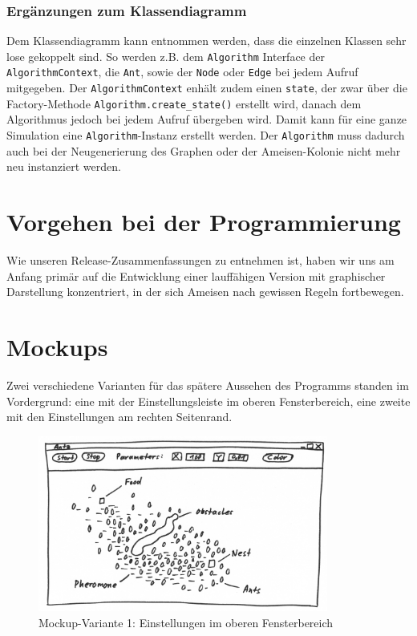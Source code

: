 \pagebreak
\subsubsection*{Ergänzungen zum Klassendiagramm}

Dem Klassendiagramm kann entnommen werden, dass die einzelnen Klassen sehr lose gekoppelt sind. So werden z.B. dem \texttt{Algorithm} Interface der \texttt{AlgorithmContext}, die \texttt{Ant}, sowie der \texttt{Node} oder \texttt{Edge} bei jedem Aufruf mitgegeben. Der \texttt{AlgorithmContext} enhält zudem einen \texttt{state}, der zwar über die Factory-Methode \texttt{Algorithm.create\_state()} erstellt wird, danach dem Algorithmus jedoch bei jedem Aufruf übergeben wird. Damit kann für eine ganze Simulation eine \texttt{Algorithm}-Instanz erstellt werden. Der \texttt{Algorithm} muss dadurch auch bei der Neugenerierung des Graphen oder der Ameisen-Kolonie nicht mehr neu instanziert werden.

\section{Vorgehen bei der Programmierung}

Wie unseren Release-Zusammenfassungen zu entnehmen ist, haben wir uns am Anfang primär auf die Entwicklung einer lauffähigen Version mit graphischer Darstellung konzentriert, in der sich Ameisen nach gewissen Regeln fortbewegen. 




\section{Mockups}

Zwei verschiedene Varianten für das spätere Aussehen des Programms standen im Vordergrund: eine mit der Einstellungsleiste im oberen Fensterbereich, eine zweite mit den Einstellungen am rechten Seitenrand.

\begin{figure}[h]
  \centering
	\includegraphics [width=0.85\textwidth]{images/Antz_Mockup_1_sw.png} 
	\caption{Mockup-Variante 1: Einstellungen im oberen Fensterbereich}
\end{figure}

